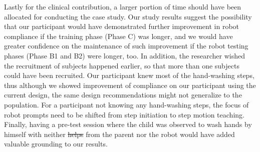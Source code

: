 \documentclass{ut-thesis}
\providecommand{\DIFaddtex}[1]{{\protect\color{blue}\uwave{#1}}} %
\providecommand{\DIFdeltex}[1]{{\protect\color{red}\sout{#1}}}                      %
\providecommand{\DIFaddbegin}{} %
\providecommand{\DIFaddend}{} %
\providecommand{\DIFdelbegin}{} %
\providecommand{\DIFdelend}{} %
\providecommand{\DIFadd}[1]{\texorpdfstring{\DIFaddtex{#1}}{#1}} %
\providecommand{\DIFdel}[1]{\texorpdfstring{\DIFdeltex{#1}}{}} %
\begin{document}
Lastly for the clinical contribution, a larger portion of time should have been allocated for conducting the case study.  Our study results suggest the possibility that our participant would have demonstrated further improvement in robot compliance if the training phase (Phase C) was longer, and we would have greater confidence on the maintenance of such improvement if the robot testing phases (Phase B1 and B2) were longer, too.  In addition, the researcher wished the recruitment of subjects happened earlier, so that more than one subjects could have been recruited.  Our participant knew most of the hand-washing steps, thus although we showed improvement of compliance on our participant using the current design, the same design recommendations might not generalize to the population.  For a participant not knowing any hand-washing steps, the focus of robot prompts need to be shifted from step initiation to step motion teaching.  Finally, having a pre-test session where the child was observed to wash hands by himself with neither \DIFdelbegin \DIFdel{helps }\DIFdelend \DIFaddbegin \DIFadd{help }\DIFaddend from the parent nor the robot would have added valuable grounding to our results.

\end{document}
